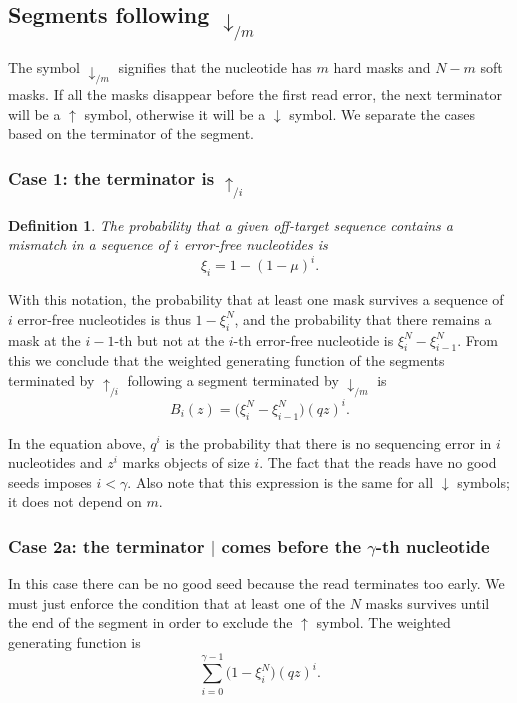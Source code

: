 \documentclass{article}
\newtheorem{definition}{Definition}
\begin{document}
\subsection{Segments following $\downarrow_{/m}$}

The symbol $\downarrow_{/m}$ signifies that the nucleotide has $m$ hard
masks and $N-m$ soft masks. If all the masks disappear before the first
read error, the next terminator will be a $\uparrow$ symbol, otherwise it
will be a $\downarrow$ symbol. We separate the cases based on the
terminator of the segment.

\subsubsection*{Case 1: the terminator is $\uparrow_{/i}$}

\begin{definition}
The probability that a given off-target sequence contains a mismatch in a
sequence of $i$ error-free nucleotides is
\begin{equation}
\label{eq:xi}
\xi_i = 1-(1-\mu)^i.
\end{equation}
\end{definition}

With this notation, the probability that at least one mask survives a
sequence of $i$ error-free nucleotides is thus $1-\xi_i^N$, and the
probability that there remains a mask at the $i-1$-th but not at the 
$i$-th error-free nucleotide is $\xi_i^N - \xi_{i-1}^N$. From this we
conclude that the weighted generating function of the segments terminated
by $\uparrow_{/i}$ following a segment terminated by $\downarrow_{/m}$ is
\begin{equation}
\label{eq:B}
B_i(z) = \Big( \xi_i^N-\xi_{i-1}^N \Big) (qz)^i.
\end{equation}

In the equation above, $q^i$ is the probability that there is no
sequencing error in $i$ nucleotides and $z^i$ marks objects of size $i$.
The fact that the reads have no good seeds imposes $i < \gamma$. Also note
that this expression is the same for all $\downarrow$ symbols; it does not
depend on $m$.

\subsubsection*{Case 2a: the terminator $|$ comes before the $\gamma$-th
nucleotide}

In this case there can be no good seed because the read terminates too
early. We must just enforce the condition that at least one of the $N$
masks survives until the end of the segment in order to exclude the
$\uparrow$ symbol. The weighted generating function is
\begin{equation*}
\sum_{i=0}^{\gamma-1} \Big(1 - \xi_i^N \Big) (qz)^i.
\end{equation*}
\end{document}
